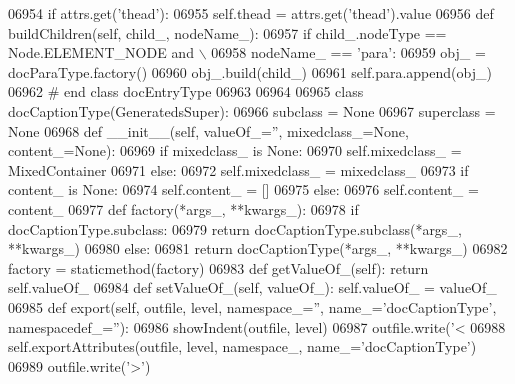 \begin{DoxyCode}
{{{{{{{{{{{{{{{{{{{{{{{{{{{{{{{{{{{{{{{{{{{{{{{{{{{{{{{{{{{{{{{{{{{{{{{{{{{{{{{{{{{{{{{{{{{{{{{{{{{{{{{{{{{{{{{{{{{{{{{{{{{{{{{{{{{{{{{{{{{{{{{{{{{{{{{{{{{{{{{{{{{{{{{{{{{{{{{{{{{{{{{{{{{{{{{{{{{{{{{{{{{{{{{{{{{{{{{{{{{{{{{{{{{{{{{{{{{{{{{{{{{{{{{{{{{{{{{{{{{{{{{{{{{{{{{{{{{{{{{{{{{{{{{{{{{{{{{{{{{{{{{{{{{{{{{{{{{{{{{{{{{{{{{{{{{{{{{{{{{{{{{{{{{{{{{{{{{{{{{{{{{{{{{{{{{{{{{{{{{{{{{{{{{{{{{{{{{{{{{{{{{{{{{{{{{{{{{{{{{{{{{{{{{{06954         \textcolor{keywordflow}{if} attrs.get(\textcolor{stringliteral}{'thead'}):
06955             self.thead = attrs.get(\textcolor{stringliteral}{'thead'}).value
06956     \textcolor{keyword}{def }buildChildren(self, child\_, nodeName\_):
06957         \textcolor{keywordflow}{if} child\_.nodeType == Node.ELEMENT\_NODE \textcolor{keywordflow}{and} \(\backslash\)
06958             nodeName\_ == \textcolor{stringliteral}{'para'}:
06959             obj\_ = docParaType.factory()
06960             obj\_.build(child\_)
06961             self.para.append(obj\_)
06962 \textcolor{comment}{# end class docEntryType}
06963 
06964 
06965 \textcolor{keyword}{class }docCaptionType(GeneratedsSuper):
06966     subclass = \textcolor{keywordtype}{None}
06967     superclass = \textcolor{keywordtype}{None}
06968     \textcolor{keyword}{def }__init__(self, valueOf\_='', mixedclass\_=None, content\_=None):
06969         \textcolor{keywordflow}{if} mixedclass\_ \textcolor{keywordflow}{is} \textcolor{keywordtype}{None}:
06970             self.mixedclass_ = MixedContainer
06971         \textcolor{keywordflow}{else}:
06972             self.mixedclass_ = mixedclass\_
06973         \textcolor{keywordflow}{if} content\_ \textcolor{keywordflow}{is} \textcolor{keywordtype}{None}:
06974             self.content_ = []
06975         \textcolor{keywordflow}{else}:
06976             self.content_ = content\_
06977     \textcolor{keyword}{def }factory(*args\_, **kwargs\_):
06978         \textcolor{keywordflow}{if} docCaptionType.subclass:
06979             \textcolor{keywordflow}{return} docCaptionType.subclass(*args\_, **kwargs\_)
06980         \textcolor{keywordflow}{else}:
06981             \textcolor{keywordflow}{return} docCaptionType(*args\_, **kwargs\_)
06982     factory = staticmethod(factory)
06983     \textcolor{keyword}{def }getValueOf_(self): \textcolor{keywordflow}{return} self.valueOf\_
06984     \textcolor{keyword}{def }setValueOf_(self, valueOf\_): self.valueOf\_ = valueOf\_
06985     \textcolor{keyword}{def }export(self, outfile, level, namespace\_='', name\_='docCaptionType', namespacedef\_=''):
06986         showIndent(outfile, level)
06987         outfile.write(\textcolor{stringliteral}{'<%
06988         self.exportAttributes(outfile, level, namespace\_, name\_=\textcolor{stringliteral}{'docCaptionType'})
06989         outfile.write(\textcolor{stringliteral}{'>'})
}}}}}}}}}}}}}}}}}}}}}}}}}}}}}}}}}}}}}}}}}}}}}}}}}}}}}}}}}}}}}}}}}}}}}}}}}}}}}}}}}}}}}}}}}}}}}}}}}}}}}}}}}}}}}}}}}}}}}}}}}}}}}}}}}}}}}}}}}}}}}}}}}}}}}}}}}}}}}}}}}}}}}}}}}}}}}}}}}}}}}}}}}}}}}}}}}}}}}}}}}}}}}}}}}}}}}}}}}}}}}}}}}}}}}}}}}}}}}}}}}}}}}}}}}}}}}}}}}}}}}}}}}}}}}}}}}}}}}}}}}}}}}}}}}}}}}}}}}}}}}}}}}}}}}}}}}}}}}}}}}}}}}}}}}}}}}}}}}}}}}}}}}}}}}}}}}}}}}}}}}}}}}}}}}}}}}}}}}}}}}}}}}}}}}}}}}}}}}}}}}}}}}}}}}}}}}}}}}}}}}}}}}}}}}
\end{DoxyCode}
